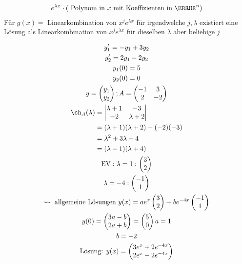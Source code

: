 \[ e^{\lambda x} \cdot (\text{ Polynom in $x$ mit Koeffizienten in $\C^n$} ) \]
Für $g(x) =$ Linearkombination von $x^j e^{\lambda x}$ für irgendwelche $j , \lambda$ existiert eine Lösung als Linearkombination von $x^j e^{\lambda x}$ für dieselben $\lambda$ aber beliebige $j$ \\
\begin{bsp*}
	\begin{gather*}
		y'_1 = -y_1 + 3y_2 \\
		y'_2 = 2y_1 - 2y_2 \\
		y_1(0) = 5 \\
		y_2(0) = 0 \\
		y = \begin{pmatrix} y_1 \\ y_2 \end{pmatrix} ; A = \begin{pmatrix} -1 & 3 \\ 2 & -2 \end{pmatrix} \\
		\begin{split}
			\ch_A(\lambda)	&= \begin{vmatrix} \lambda + 1 & -3 \\ -2 & \lambda + 2 \end{vmatrix} \\
						&= (\lambda + 1)(\lambda + 2) - (-2)(-3) \\
						&= \lambda^2 + 3\lambda - 4 \\
						&= (\lambda - 1)(\lambda + 4)
		\end{split} \\
		\text{EV} : 
		\lambda = 1 : \begin{pmatrix} 3 \\ 2 \end{pmatrix} \\
		\lambda = -4 : \begin{pmatrix} -1 \\ 1 \end{pmatrix} \\
		\rightsquigarrow \text{ allgemeine Lösungen } y(x) = ae^x \begin{pmatrix} 3 \\ 2 \end{pmatrix} + be^{-4x} \begin{pmatrix} -1 \\ 1 \end{pmatrix} \\
		y(0) = \begin{pmatrix} 3a - b \\ 2a+ b \end{pmatrix} = \begin{pmatrix} 5 \\ 0 \end{pmatrix}
		a = 1 \\
		b = -2 \\
		\text{Lösung: } y(x) = \begin{pmatrix} 3e^x + 2e^{-4x} \\ 2e^x - 2e^{-4x} \end{pmatrix}
	\end{gather*}
\end{bsp*}
